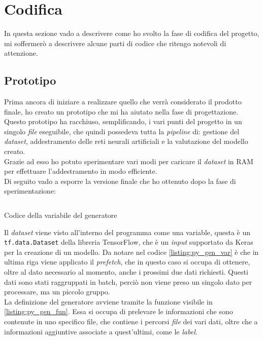 \section{Codifica}\label{sec:coding}\noindent
In questa sezione vado a descrivere come ho svolto la fase di codifica del progetto, mi soffermerò a descrivere alcune parti di codice che ritengo notevoli di attenzione.

\subsection{Prototipo}\noindent
Prima ancora di iniziare a realizzare quello che verrà considerato il prodotto finale, ho creato un prototipo che mi ha aiutato nella fase di progettazione.\\
Questo prototipo ha racchiuso, semplificando, i vari punti del progetto in un singolo \textit{file} eseguibile, che quindi possedeva tutta la \textit{pipeline} di: gestione del \textit{dataset}, addestramento delle reti neurali artificiali e la valutazione del modello creato.\\
Grazie ad esso ho potuto sperimentare vari modi per caricare il \textit{dataset} in RAM per effettuare l'addestramento in modo efficiente.\\
Di seguito vado a esporre la versione finale che ho ottenuto dopo la fase di sperimentazione:
\begin{listing}[H]
    \inputminted{python}{code/generator.py}
    \caption{Codice della variabile del generatore}
    \label{listing:py_gen_var}
\end{listing}\noindent
Il \textit{dataset} viene visto all'interno del programma come una variable, questa è un \texttt{tf.data.Dataset} della libreria TensorFlow, che è un \textit{input} supportato da Keras per la creazione di un modello.
Da notare nel codice \ref{listing:py_gen_var} è che in ultima riga viene applicato il \textit{prefetch}, che in questo caso si occupa di ottenere, oltre al dato necessario al momento, anche i prossimi due dati richiesti. Questi dati sono stati raggruppati in \gls{batch}, perciò non viene preso un singolo dato per processare, ma un piccolo gruppo.\\
La definizione del generatore avviene tramite la funzione visibile in \ref{listing:py_gen_fun}.
Essa si occupa di prelevare le informazioni che sono contenute in uno specifico file, che contiene i percorsi \textit{file} dei vari dati, oltre che a informazioni aggiuntive associate a quest'ultimi, come le \textit{label}.
